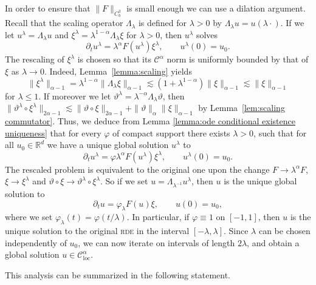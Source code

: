 \documentclass[a4paper,11pt]{article}
\newcommand{\tmop}[1]{\ensuremath{\operatorname{#1}}}
\theoremstyle{remark}
\newcommand{\CC}{\ensuremath{\mathscr{C}}}
\newcommand{\reso}{\,\mathord{\circ}\,}
\begin{document}
In order to ensure that $\| F \|_{C^{3}_{b}}$ is small enough we can use a
dilation argument. Recall that the scaling operator $\Lambda_\lambda$ is defined for $\lambda > 0$ by $\Lambda_\lambda u = u(\lambda \cdot)$. If we let $u^{\lambda} = \Lambda_{\lambda} u$ and
$\xi^{\lambda} = \lambda^{1- \alpha} \Lambda_{\lambda} \xi$ for $\lambda >0$,
then $u^{\lambda}$ solves
\[
   \partial_{t} u^{\lambda} = \lambda^{\alpha} F ( u^{\lambda} ) \xi^{\lambda}, \qquad u^\lambda(0) = u_0.
\]
The rescaling of $\xi^{\lambda}$ is chosen so that its $\CC^{\alpha}$ norm is
uniformly bounded by that of $\xi$ as $\lambda \rightarrow 0$. Indeed,
Lemma~\ref{lemma:scaling} yields
\[
   \| \xi^{\lambda} \|_{\alpha -1} = \lambda^{1- \alpha} \| \Lambda_{\lambda} \xi \|_{\alpha -1} \lesssim ( 1+ \lambda^{1- \alpha} ) \| \xi \|_{\alpha -1} \lesssim \| \xi \|_{\alpha -1}
\]
for $\lambda \leqslant 1$. If moreover we let $\vartheta^{\lambda} = \lambda^{- \alpha} \Lambda_{\lambda} \vartheta$, then $\| \vartheta^{\lambda} \reso \xi^{\lambda} \|_{2 \alpha -1} \lesssim \| \vartheta \reso   \xi \|_{2 \alpha -1} + \| \vartheta\|_\alpha \|\xi\|_{\alpha-1}$ by Lemma~\ref{lem:scaling commutator}. Thus, we deduce from Lemma \ref{lemma:ode conditional existence uniqueness} that for every $\varphi$
of compact support there exists $\lambda >0$, such that for all $u_{0} \in \mathbb{R}^{d}$ we have a unique
global solution $u^{\lambda}$ to
\[
   \partial_{t} u^{\lambda} = \varphi \lambda^{\alpha} F ( u^{\lambda} ) \xi^{\lambda}, \qquad u^\lambda(0) = u_0.
\]
The rescaled problem is
equivalent to the original one upon the change $F \rightarrow \lambda^{\alpha} F$, $\xi \rightarrow \xi^{\lambda}$ and $\vartheta \reso   \xi \rightarrow \vartheta^{\lambda} \reso   \xi^{\lambda}$. So if we set $u= \Lambda_{\lambda^{-1}} u^{\lambda}$, then $u$ is the unique global solution to
\[
   \partial_{t} u= \varphi_{\lambda} F ( u ) \xi, \qquad u(0) = u_0,
\]
where we set $\varphi_\lambda(t) = \varphi(t/\lambda)$. In particular, if $\varphi \equiv 1$
on $[ -1,1 ]$, then $u$ is the unique solution to the original \textsc{rde} in the
interval $[ - \lambda, \lambda]$.
Since $\lambda$ can be chosen independently of $u_{0}$, we can now iterate on
intervals of length $2\lambda$, and obtain a global solution $u \in \CC^{\alpha}_{\tmop{loc}}$.



This analysis can be summarized in the following statement.
\end{document}
